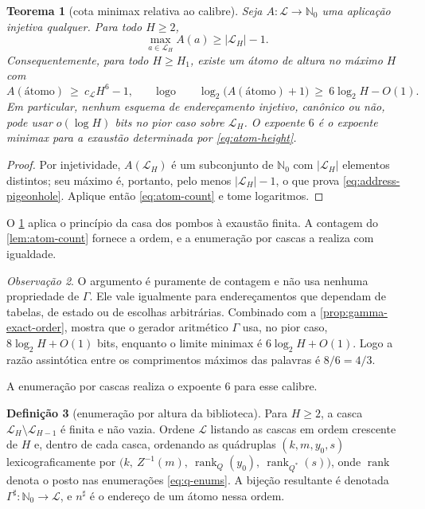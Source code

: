 \documentclass[11pt,a4paper]{article}
\newtheorem{theorem}{Teorema}[section]
\theoremstyle{definition}
\newtheorem{definition}[theorem]{Definição}
\theoremstyle{remark}
\newtheorem{remark}[theorem]{Observação}
\newcommand{\Nzero}{\mathbb{N}_0}
\newcommand{\Library}{\mathcal{L}}
\newcommand{\rank}{\operatorname{rank}}
\begin{document}
\begin{theorem}[cota minimax relativa ao calibre]\label{thm:address-lower}
Seja $A:\Library\to\Nzero$ uma aplicação injetiva qualquer. Para todo $H\ge2$,
\begin{equation}
 \max_{a\in\Library_H}A(a)\ge |\Library_H|-1.
 \label{eq:address-pigeonhole}
\end{equation}
Consequentemente, para todo $H\ge H_1$, existe um átomo de altura no máximo
$H$ com
\begin{equation}
 A(\text{átomo})\ \ge\ c_\Library H^6-1,
 \qquad\text{logo}\qquad
 \log_2\bigl(A(\text{átomo})+1\bigr)\ \ge\ 6\log_2H-O(1).
 \label{eq:address-lower}
\end{equation}
Em particular, nenhum esquema de endereçamento injetivo, canônico ou não,
pode usar $o(\log H)$ bits no pior caso sobre $\Library_H$. O expoente $6$ é
o expoente minimax para a exaustão determinada por \eqref{eq:atom-height}.
\end{theorem}

\begin{proof}
Por injetividade, $A(\Library_H)$ é um subconjunto de $\Nzero$ com
$|\Library_H|$ elementos distintos; seu máximo é, portanto, pelo menos
$|\Library_H|-1$, o que prova \eqref{eq:address-pigeonhole}. Aplique então
\eqref{eq:atom-count} e tome logaritmos.
\end{proof}

O \cref{thm:address-lower} aplica o princípio da casa dos pombos à exaustão finita. A contagem do \cref{lem:atom-count} fornece a ordem, e a enumeração por cascas a realiza com igualdade.

\begin{remark}
O argumento é puramente de contagem e não usa nenhuma propriedade de $\Gamma$. Ele vale igualmente para endereçamentos que dependam de tabelas, de estado ou de escolhas arbitrárias. Combinado com a \cref{prop:gamma-exact-order}, mostra que o gerador aritmético $\Gamma$ usa, no pior caso, $8\log_2H+O(1)$ bits, enquanto o limite minimax é $6\log_2H+O(1)$. Logo a razão assintótica entre os comprimentos máximos das palavras é $8/6=4/3$.
\end{remark}

A enumeração por cascas realiza o expoente $6$ para esse calibre.

\begin{definition}[enumeração por altura da biblioteca]\label{def:sharp}
Para $H\ge2$, a casca $\Library_H\setminus\Library_{H-1}$ é finita e não vazia. Ordene $\Library$ listando as cascas em ordem crescente de $H$ e, dentro de cada casca, ordenando as quádruplas $(k,m,y_0,s)$ lexicograficamente por $\bigl(k,\ Z^{-1}(m),\ \rank_Q(y_0),\ \rank_{Q^*}(s)\bigr)$, onde $\rank$ denota o posto nas enumerações \eqref{eq:q-enums}. A bijeção resultante é denotada $\Gamma^\sharp:\Nzero\to\Library$, e $n^\sharp$ é o endereço de um átomo nessa ordem.
\end{definition}
\end{document}
